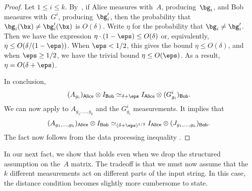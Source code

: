 \documentclass[11pt]{article}
\newcommand{\reg}[1]{{\mathsf{#1}}}
\begin{document}
\begin{proof}
Let $1 \leq i \leq k$.
By~,
if Alice measures with~$A$, producing~$\bg_i$, and Bob measures with~$G^i$, producing~$\bg_i'$,
then the probability that $\bg_i(\bx) \neq \bg_i'(\bx)$ is $O(\delta)$.
Write $\eta$ for the probability that $\bg_i \neq \bg_i'$.
Then we have the expression $\eta \cdot (1-\eps) \leq O(\delta)$ or, equivalently, $\eta \leq O(\delta/(1-\eps))$.
When $\eps < 1/2$, this gives the bound $\eta \leq O(\delta)$, and when $\eps \geq 1/2$, we have the trivial bound $\eta \leq O(\eps)$.
As a result, $\eta = O(\delta + \eps)$.

In conclusion,
\begin{equation*}
(A_{g_i})_{\reg{Alice}} \otimes I_{\reg{Bob}} \simeq_{\delta + \eps} I_{\reg{Alice}} \otimes (G^i_{g_i})_{\reg{Bob}}.
\end{equation*}
We can now apply  to $A_{g_1, \ldots, g_k}$ and the $G^i_{g_i}$ measurements.
It implies that
\begin{equation*}
(A_{g_1, \ldots, g_k})_{\reg{Alice}} \otimes I_{\reg{Bob}} \simeq_{(\delta+\eps)^{1/2}} I_{\reg{Alice}} \otimes (J_{g_1, \ldots, g_k})_{\reg{Bob}}.
\end{equation*}
The fact now follows from the data processing inequality .
\end{proof}

In our next fact, we show that  holds even when we drop the structured assumption on the~$A$ matrix.
The tradeoff is that we must now assume that the~$k$ different measurements act on different parts of the input string.
In this case, the distance condition becomes slightly more cumbersome to state.
\end{document}
